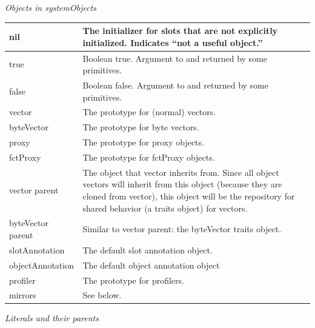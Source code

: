 \documentclass[letterpaper,10pt,english]{sphinxmanual}
\begin{document}
\emph{Objects in systemObjects}

\begin{tabulary}{\linewidth}{p{5cm} p{10cm}}
\hline

nil
 & 
The initializer for slots that are not explicitly initialized. Indicates “not a useful object.”
\\\hline

true
 & 
Boolean true. Argument to and returned by some primitives.
\\\hline

false
 & 
Boolean false. Argument to and returned by some primitives.
\\\hline

vector
 & 
The prototype for (normal) vectors.
\\\hline

byteVector
 & 
The prototype for byte vectors.
\\\hline

proxy
 & 
The prototype for proxy objects.
\\\hline

fctProxy
 & 
The prototype for fctProxy objects.
\\\hline

vector parent
 & 
The object that vector inherits from. Since all object vectors will inherit from this object (because they are cloned from vector), this object will be the repository for shared behavior (a traits object) for vectors.
\\\hline

byteVector parent
 & 
Similar to vector parent: the byteVector traits object.
\\\hline

slotAnnotation
 & 
The default slot annotation object.
\\\hline

objectAnnotation
 & 
The default object annotation object
\\\hline

profiler
 & 
The prototype for profilers.
\\\hline

mirrors
 & 
See below.
\\\hline
\end{tabulary}


\emph{Literals and their parents}
\end{document}
